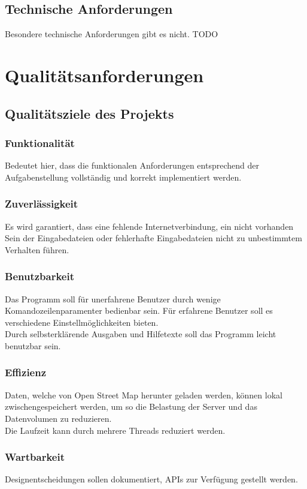 \subsection{Technische Anforderungen}
Besondere technische Anforderungen gibt es nicht.
TODO
\section{Qualitätsanforderungen}
\subsection{Qualitätsziele des Projekts}
\subsubsection{Funktionalität}
Bedeutet hier, dass die funktionalen Anforderungen entsprechend der Aufgabenstellung vollständig und korrekt implementiert werden.

\subsubsection{Zuverlässigkeit}
Es wird garantiert, dass eine fehlende Internetverbindung, ein nicht vorhanden Sein der Eingabedateien oder fehlerhafte Eingabedateien
nicht zu unbestimmtem Verhalten führen.

\subsubsection{Benutzbarkeit}
Das Programm soll für unerfahrene Benutzer durch wenige Komandozeilenparamenter bedienbar sein. Für erfahrene Benutzer soll es
verschiedene Einstellmöglichkeiten bieten.\\
Durch selbsterklärende Ausgaben und Hilfetexte soll das Programm leicht benutzbar sein.

\subsubsection{Effizienz}
Daten, welche von Open Street Map herunter geladen werden, können lokal zwischengespeichert werden, um so die Belastung der Server und 
das Datenvolumen zu reduzieren.\\
Die Laufzeit kann durch mehrere Threads reduziert werden.

\subsubsection{Wartbarkeit}
Designentscheidungen sollen dokumentiert, APIs zur Verfügung gestellt werden. 

